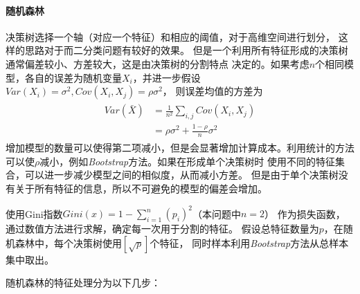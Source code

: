 \paragraph{随机森林}
决策树选择一个轴（对应一个特征）和相应的阈值，对于高维空间进行划分，
这样的思路对于而二分类问题有较好的效果。
但是一个利用所有特征形成的决策树通常偏差较小、方差较大，这是由决策树的分割特点
决定的。如果考虑$n$个相同模型，各自的误差为随机变量$X_i$，并进一步假设
$Var(X_i)=\sigma^2,Cov(X_i,X_j)=\rho\sigma^2$，
则误差均值的方差为
\begin{align*}
    \begin{split}
        Var(\bar{X})&=\frac{1}{n^2}\sum\limits_{i,j}Cov(X_i, X_j) \\
        & = \rho\sigma^2 + \frac{1-\rho}{n}\sigma^2
    \end{split}
\end{align*}
增加模型的数量可以使得第二项减小，但是会显著增加计算成本。利用统计的方法
可以使$\rho$减小，例如\textit{Bootstrap}方法。如果在形成单个决策树时
使用不同的特征集合，可以进一步减少模型之间的相似度，从而减小方差。
但是由于单个决策树没有关于所有特征的信息，所以不可避免的模型的偏差会增加。
\par 使用Gini指数$Gini(x)=1-\sum_{i=1}^n (p_i)^2$（本问题中$n=2$）
作为损失函数，通过数值方法进行求解，确定每一次用于分割的特征。
假设总特征数量为$p$，在随机森林中，每个决策树使用$[\sqrt{p}]$个特征，
同时样本利用\textit{Bootstrap}方法从总样本集中取出。
\par 随机森林的特征处理分为以下几步：
